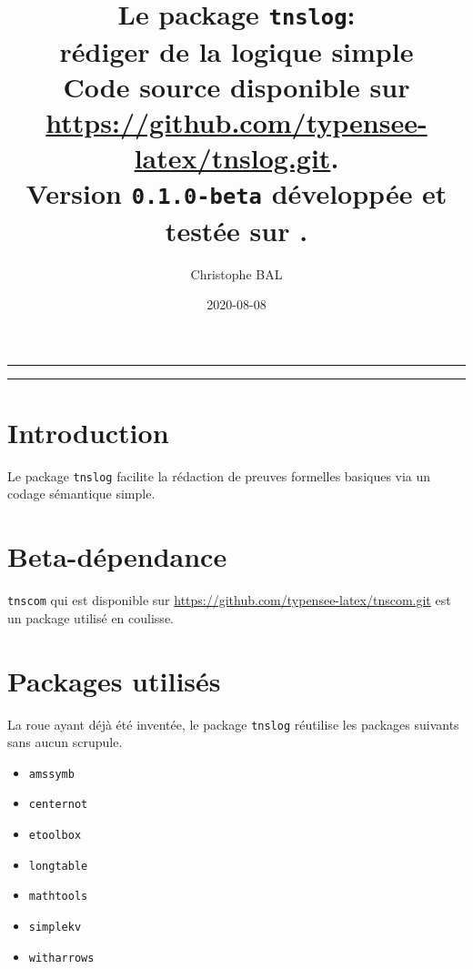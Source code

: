\documentclass[12pt,a4paper]{article}
\theoremstyle{definition}
\begin{document}
\renewcommand\labelitemi{\raisebox{0.125em}{\tiny\textbullet}}
\renewcommand{\labelitemii}{---}

\title{  %
	Le package \texttt{tnslog}:\\%
	rédiger de la logique simple\\%
	{\footnotesize Code source disponible sur \url{https://github.com/typensee-latex/tnslog.git}.}\\%
{\footnotesize Version \texttt{0.1.0-beta} développée et testée sur \macosxname{}.}%
}
\author{Christophe BAL}
\date{2020-08-08}

\maketitle


\vspace{2em}

\hrule

\tableofcontents

\vspace{1.5em}

\hrule

\newpage

\section{Introduction}

Le package \verb+tnslog+ facilite la rédaction de preuves formelles basiques via un codage sémantique simple.


\section{Beta-dépendance}

\verb#tnscom# qui est disponible sur \url{https://github.com/typensee-latex/tnscom.git} est un package utilisé en coulisse.
\section{Packages utilisés}

La roue ayant déjà été inventée, le package \verb#tnslog# réutilise les packages suivants sans aucun scrupule.

\begin{multicols}{4}
    \begin{itemize}
        \item \verb#amssymb#
        \item \verb#centernot#
        \item \verb#etoolbox#
        \item \verb#longtable#
        \item \verb#mathtools#
        \item \verb#simplekv#
        \item \verb#witharrows#
    \end{itemize}
\end{multicols}
\end{document}
